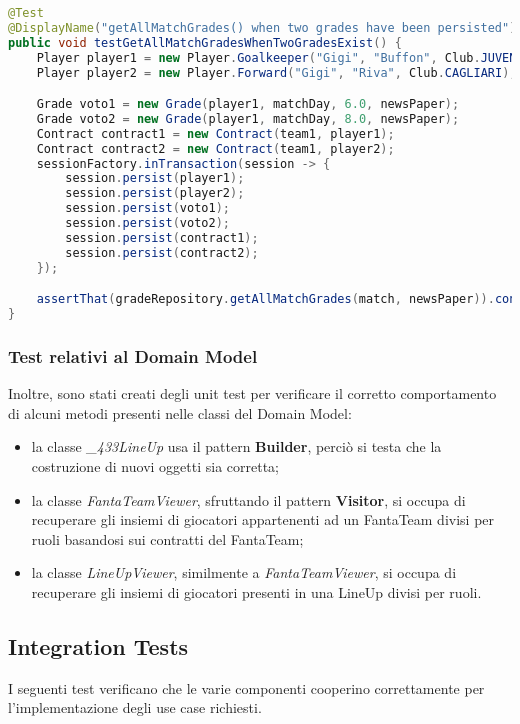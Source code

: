 \begin{lstlisting}[language=Java]
@Test
@DisplayName("getAllMatchGrades() when two grades have been persisted")
public void testGetAllMatchGradesWhenTwoGradesExist() {
	Player player1 = new Player.Goalkeeper("Gigi", "Buffon", Club.JUVENTUS);
	Player player2 = new Player.Forward("Gigi", "Riva", Club.CAGLIARI);

    Grade voto1 = new Grade(player1, matchDay, 6.0, newsPaper);
	Grade voto2 = new Grade(player1, matchDay, 8.0, newsPaper);
	Contract contract1 = new Contract(team1, player1);
	Contract contract2 = new Contract(team1, player2);
	sessionFactory.inTransaction(session -> {
		session.persist(player1);
		session.persist(player2);
		session.persist(voto1);
		session.persist(voto2);
		session.persist(contract1);
		session.persist(contract2);
	});

	assertThat(gradeRepository.getAllMatchGrades(match, newsPaper)).containsExactly(voto1, voto2);
}
\end{lstlisting}


\subsubsection{Test relativi al Domain Model}

Inoltre, sono stati creati degli unit test per verificare il corretto comportamento di alcuni metodi presenti nelle classi del Domain Model:
\begin{itemize}
    \item la classe \textit{\_433LineUp} usa il pattern \textbf{Builder}, perciò si testa che la costruzione di nuovi oggetti sia corretta;
    \item la classe \textit{FantaTeamViewer}, sfruttando il pattern \textbf{Visitor}, si occupa di recuperare gli 
        insiemi di giocatori appartenenti ad un FantaTeam divisi per ruoli basandosi sui contratti del FantaTeam;
    \item la classe \textit{LineUpViewer}, similmente a \textit{FantaTeamViewer}, si occupa di recuperare gli 
        insiemi di giocatori presenti in una LineUp divisi per ruoli.
\end{itemize}



\subsection{Integration Tests}

I seguenti test verificano che le varie componenti cooperino correttamente per l'implementazione degli use case richiesti.

